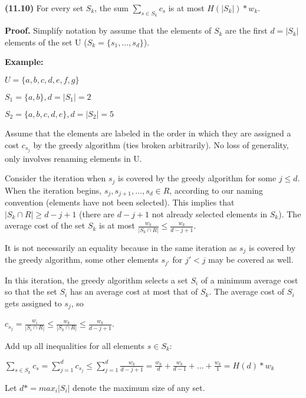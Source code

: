 \documentclass{proc}
\begin{document}
\begin{mdframed}
    \textbf{(11.10)} For every set $S_k$, the sum $\sum_{s \in S_k} c_s$ is at most $H(|S_k|)*w_k$.
    
    \textbf{Proof.}
    Simplify notation by assume that the elements of $S_k$ are the first $d = |S_k|$ elements of the set U ($S_k = \{s_1,\ldots, s_d\}$).
    
    \begin{mdframed}
        \textbf{Example:}
    
        $U = \{a,b,c,d,e,f,g\}$
    
        $S_1 = \{a, b\}, d = |S_1| = 2$
    
        $S_2 = \{a,b,c,d,e\}, d = |S_2| = 5$
    \end{mdframed}
    
    Assume that the elements are labeled in the order in which they are assigned a cost $c_{s_j}$ by the greedy algorithm (ties broken arbitrarily). No loss of generality, only involves renaming elements in U.
    
    Consider the iteration when $s_j$ is covered by the greedy algorithm for some $j \le d$. When the iteration begins, $s_j, s_{j+1}, \ldots, s_d \in R$, according to our naming convention (elements have not been selected). This implies that $|S_k \cap R| \ge d - j + 1$ (there are $d - j + 1$ not already selected elements in $S_k$). The average cost of the set $S_k$ is at most $\frac{w_k}{|S_k \cap R|} \leq \frac{w_k}{d-j+1}$.
    
    It is not necessarily an equality because in the same iteration as $s_j$ is covered by the greedy algorithm, some other elements $s_{j'}$ for $j' < j$ may be covered as well.
    
    In this iteration, the greedy algorithm selects a set $S_i$ of a minimum average cost so that the set $S_i$ has an average cost at most that of $S_k$. The average cost of $S_i$ gets assigned to $s_j$, so
    
    $c_{s_j} = \frac{w_i}{|S_i \cap R|} \le \frac{w_k}{|S_k \cap R|} \le \frac{w_k}{d-j+1}$.
    
    Add up all inequalities for all elements $s \in S_k$:
    
    $\sum_{s \in S_k} c_s = \sum_{j=1}^{d} c_{s_j} \le \sum_{j=1}^{d} \frac{w_k}{d-j+1} = \frac{w_k}{d} + \frac{w_k}{d-1} + \ldots + \frac{w_k}{1} = H(d) * w_k$
\end{mdframed}

Let $d* = max_i |S_i|$ denote the maximum size of any set.
\end{document}
